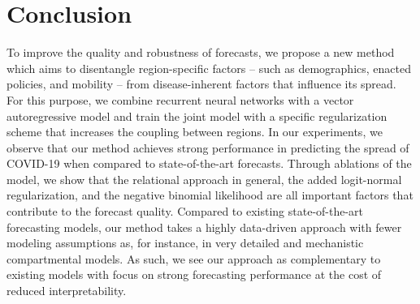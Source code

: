\documentclass[nobib]{tufte-handout}
\begin{document}
\section{Conclusion}
\label{sec:org29e484b}
To improve the quality and robustness of forecasts, we propose a new method
which aims to disentangle region-specific factors -- such as demographics,
enacted policies, and mobility -- from disease-inherent factors that influence
its spread. For this purpose, we combine recurrent neural networks with a vector
autoregressive model and train the joint model with a specific regularization
scheme that increases the coupling between regions. In our experiments, we
observe that our method achieves strong performance in predicting the spread of
COVID-19 when compared to state-of-the-art forecasts. Through ablations of the
model, we show that the relational approach in general, the added logit-normal
regularization, and the negative binomial likelihood are all important factors
that contribute to the forecast quality. Compared to existing state-of-the-art
forecasting models, our method takes a highly data-driven approach with fewer
modeling assumptions as, for instance, in very detailed and mechanistic
compartmental models. As such, we see our approach as complementary to existing
models with focus on strong forecasting performance at the cost of reduced
interpretability.



\newpage
\printbibliography
\end{document}
